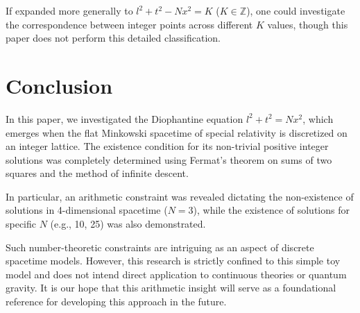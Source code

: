 \documentclass[11pt,a4paper]{article}
\begin{document}
If expanded more generally to \( l^2 + t^2 - N x^2 = K \) (\( K \in \mathbb{Z} \)), one could investigate the correspondence between integer points across different \( K \) values, though this paper does not perform this detailed classification.

\section{Conclusion}
In this paper, we investigated the Diophantine equation \( l^2 + t^2 = N x^2 \), which emerges when the flat Minkowski spacetime of special relativity is discretized on an integer lattice. The existence condition for its non-trivial positive integer solutions was completely determined using Fermat's theorem on sums of two squares and the method of infinite descent.

In particular, an arithmetic constraint was revealed dictating the non-existence of solutions in 4-dimensional spacetime (\( N=3 \)), while the existence of solutions for specific \( N \) (e.g., 10, 25) was also demonstrated.

Such number-theoretic constraints are intriguing as an aspect of discrete spacetime models. However, this research is strictly confined to this simple toy model and does not intend direct application to continuous theories or quantum gravity. It is our hope that this arithmetic insight will serve as a foundational reference for developing this approach in the future.
\end{document}
